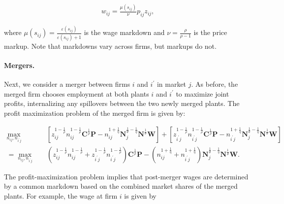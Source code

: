 \documentclass[12pt]{article}
\theoremstyle{prop}
\begin{document}
\begin{equation*}
    \begin{aligned}
        w_{ij} = \frac{\mu(s_{ij})}{\nu} p_{ij} z_{ij}, 
    \end{aligned}
\end{equation*}

where $\mu(s_{ij}) = \frac{\varepsilon(s_{ij})}{\varepsilon(s_{ij})+1}$ is the wage markdown and $\nu= \frac{\rho}{\rho-1}$ is the price markup. Note that markdowns vary across firms, but markups do not. 

\paragraph{Mergers.} 

Next, we consider a merger between firms $i$ and $i^\prime$ in market $j$. As before, the merged firm chooses employment at both plants $i$ and $i^\prime$ to maximize joint profits, internalizing any spillovers between the two newly merged plants. The profit maximization problem of the merged firm is given by:

\begin{equation*}
    \begin{aligned}
        \max_{n_{ij},n_{i^\prime j} }\quad  & \left[z_{ij}^{1-\frac{1}{\rho}} n_{ij}^{1-\frac{1}{\rho}} \mathbf{C}^{\frac{1}{\rho}} \mathbf{P} - n_{ij}^{1+\frac{1}{\eta}} \textbf{N}_{j}^{\frac{1}{\theta} - \frac{1}{\eta}} \textbf{N}^{\frac{1}{\theta}} \textbf{W}\right] + \left[z_{i^\prime j}^{1-\frac{1}{\rho}} n_{i^\prime j}^{1-\frac{1}{\rho}} \mathbf{C}^{\frac{1}{\rho}} \mathbf{P} - n_{i^\prime j}^{1+\frac{1}{\eta}} \textbf{N}_{j}^{\frac{1}{\theta} - \frac{1}{\eta}} \textbf{N}^{\frac{1}{\theta}} \textbf{W}\right]\\
        =\max_{n_{ij},n_{i^\prime j} }\quad  & \left(z_{ij}^{1-\frac{1}{\rho}} n_{ij}^{1-\frac{1}{\rho}} + z_{i^\prime j}^{1-\frac{1}{\rho}} n_{i^\prime j}^{1-\frac{1}{\rho}}\right) \mathbf{C}^{\frac{1}{\rho}} \mathbf{P} - \left(n_{ij}^{1+\frac{1}{\eta}} + n_{i^\prime j}^{1+\frac{1}{\eta}} \right)\textbf{N}_{j}^{\frac{1}{\theta} - \frac{1}{\eta}} \textbf{N}^{\frac{1}{\theta}} \textbf{W}.        
    \end{aligned}
\end{equation*}

The profit-maximization problem implies that post-merger wages are determined by a common markdown based on the combined market shares of the merged plants. For example, the wage at firm $i$ is given by 
\end{document}
